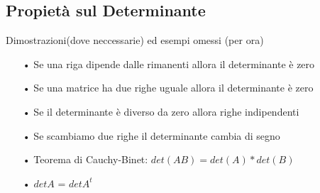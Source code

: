 \subsection{Propietà sul Determinante}
Dimostrazioni(dove neccessarie) ed esempi omessi (per ora)
\begin{itemize}
\item[•] Se una riga dipende dalle rimanenti allora il determinante è zero
\item[•] Se una matrice ha due righe uguale allora il determinante è zero
\item[•] Se il determinante è diverso da zero allora righe indipendenti
\item[•] Se scambiamo due righe il determinante cambia di segno
\item[•] Teorema di Cauchy-Binet: $det(AB) = det(A) * det(B)$
\item[•] $det A$ = $det A^t$
\end{itemize}


